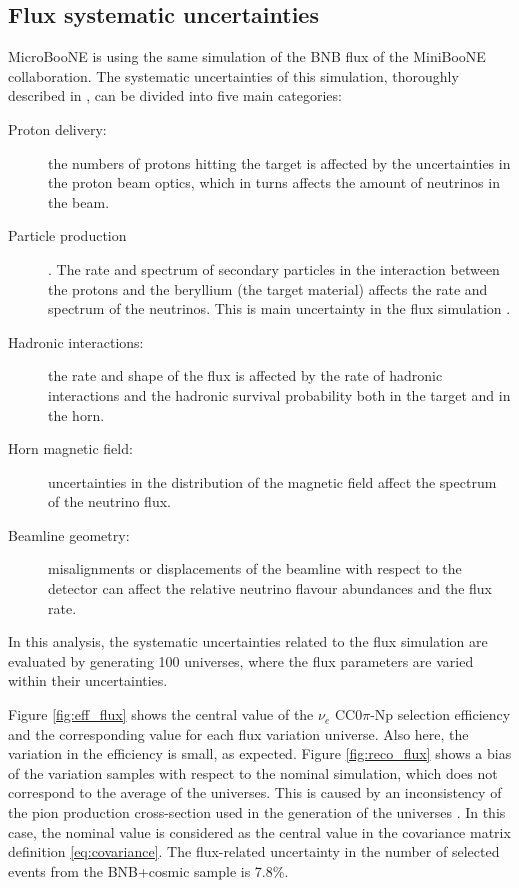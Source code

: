 \subsection{Flux systematic uncertainties}
MicroBooNE is using the same simulation of the BNB flux of the MiniBooNE collaboration. The systematic uncertainties of this simulation, thoroughly described in \cite{miniboone_flux}, can be divided into five main categories:
\begin{description}
\item[Proton delivery:] the numbers of protons hitting the target is affected by the uncertainties in the proton beam optics, which in turns affects the amount of neutrinos in the beam.
\item[Particle production]. The rate and spectrum of secondary particles in the interaction between the protons and the beryllium (the target material) affects the rate and spectrum of the neutrinos. This is main uncertainty in the flux simulation \cite{miniboone_flux}.
\item[Hadronic interactions:] the rate and shape of the flux is affected by the rate of hadronic interactions and the hadronic survival probability both in the target and in the horn.
\item[Horn magnetic field:] uncertainties in the distribution of the magnetic field affect the spectrum of the neutrino flux.
\item[Beamline geometry:] misalignments or displacements of the beamline with respect to the detector can affect the relative neutrino flavour abundances and the flux rate.
\end{description}

In this analysis, the systematic uncertainties related to the flux simulation are evaluated by generating 100 universes, where the flux parameters are varied within their uncertainties. 

Figure \ref{fig:eff_flux} shows the central value of the $\nu_{e}$ CC0$\pi$-Np selection efficiency and the corresponding value for each flux variation universe. Also here, the variation in the efficiency is small, as expected. Figure \ref{fig:reco_flux} shows a bias of the variation samples with respect to the nominal simulation, which does not correspond to the average of the universes. This is caused by an inconsistency of the pion production cross-section used in the generation of the universes \cite{ubxsec, harp}. In this case, the nominal value is considered as the central value in the covariance matrix definition \eqref{eq:covariance}. The flux-related uncertainty in the number of selected events from the BNB+cosmic sample is 7.8\%.

